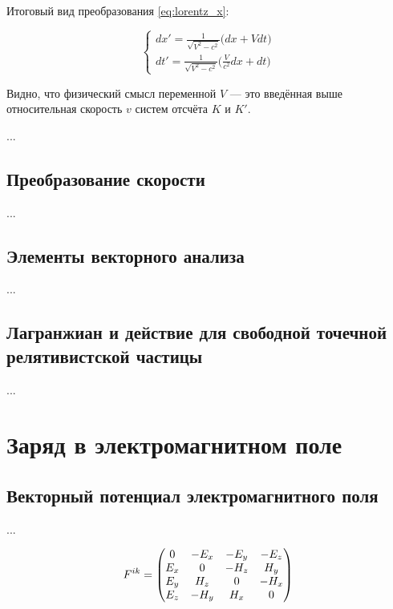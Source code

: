 \documentclass{article}
\begin{document}
Итоговый вид преобразования \eqref{eq:lorentz_x}:

\begin{equation*}
    \begin{cases}
    dx'=\frac{1}{\sqrt{V^2-c^2}}\big(dx+Vdt\big)\\
    dt'=\frac{1}{\sqrt{V^2-c^2}}\big(\frac{V}{c^2}dx+dt\big)
    \end{cases}
\end{equation*}

Видно, что физический смысл переменной $V$ — это введённая выше относительная скорость $v$ систем отсчёта $K$ и $K'$.

...

\subsection{Преобразование скорости}

...

\subsection{Элементы векторного анализа}

...

\subsection{Лагранжиан и действие для свободной точечной релятивистской частицы}

...

\section{Заряд в электромагнитном поле}

\subsection{Векторный потенциал электромагнитного поля}

...

\begin{equation}\label{eq:fmatrix}
    \tensor{F}{^i^k} =
    \begin{pmatrix}
        0 & -E_x & -E_y & -E_z \\
        E_x & 0 & -H_z & H_y \\
        E_y & H_z & 0 & -H_x \\
        E_z & -H_y & H_x & 0
    \end{pmatrix}
\end{equation}
\end{document}
